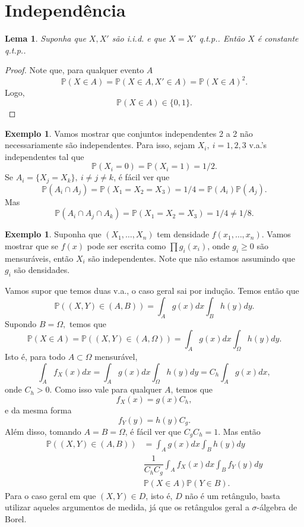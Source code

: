 \documentclass[12pt,a4paper,oneside]{book}
\newtheorem{lemma}[theorem]{Lema}
\theoremstyle{definition}
\newtheorem{example}[theorem]{Exemplo}
\theoremstyle{remark}
\numberwithin{equation}{section}
\newcommand{\pr}{\mathbb{P}}
\begin{document}
\newpage
\section{Independência}

\begin{lemma} Suponha que $X,X'$ são i.i.d. e que $X= X'$ q.t.p.. Então $X$ é constante q.t.p..
\end{lemma}
\begin{proof}
Note que, para qualquer evento $A$
$$\pr(X\in A) = \pr(X\in A, X'\in A) = \pr(X\in A)^2. $$
Logo, 
$$\pr(X\in A)\in \{0,1\}. $$
\end{proof}




\begin{example}
Vamos mostrar que conjuntos independentes 2 a 2 não necessariamente são independentes. Para isso, sejam $X_i, \ i=1,2,3$ v.a.'s independentes  tal que
$$\pr(X_i=0)=\pr(X_i=1) = 1/2. $$
Se $A_{i} =\{X_j=X_k\},\  i\neq j\neq k$, é fácil ver que 
$$\pr(A_{i}\cap A_{j}) = \pr(X_1=X_2=X_3)  = 1/4 = \pr(A_i)\pr(A_j).$$
Mas
$$\pr(A_{i}\cap A_{j}\cap A_k) = \pr(X_1=X_2=X_3)  = 1/4 \neq 1/8. $$
\end{example}

\begin{example}
Suponha que $(X_1,\dots, X_n)$ tem densidade $f(x_1,\dots,x_n).$ Vamos mostrar que se $f(x)$ pode ser escrita como $\prod g_i(x_i)$, onde $g_i\geq 0$ são mensuráveis, então $X_i$ são independentes. Note que não estamos assumindo que $g_i$ são densidades.

Vamos supor que temos duas v.a., o caso geral sai por indução. Temos então que
$$\pr((X,Y)\in (A,B)) = \int_A g(x)dx \int_B h(y)dy. $$
Supondo $B=\Omega,$ temos que
$$\pr(X\in A) = \pr((X,Y)\in (A,\Omega)) = \int_A g(x)dx \int_\Omega h(y)dy. $$
Isto é, para todo $A\subset \Omega$ mensurável,
$$\int_A f_X(x)dx  =\int_A g(x)dx \int_\Omega h(y)dy =  C_h\int_A g(x)dx, $$
onde $C_h>0.$ Como isso vale para qualquer $A$, temos que
$$f_X(x) = g(x)C_h, $$
e da mesma forma
$$f_Y(y) = h(y)C_g. $$
Além disso, tomando $A=B=\Omega$, é fácil ver que $C_gC_h=1.$
Mas então
\begin{align*}
\pr((X,Y)\in (A,B)) &= \int_A g(x)dx \int_B h(y)dy \\
& \dfrac{1}{C_hC_g}\int_A f_X(x)dx \int_B f_Y(y)dy \\
& \pr(X\in A)\pr(Y\in B).
\end{align*}
Para o caso geral em que $(X,Y)\in D$, isto é, $D$ não é um retângulo, basta utilizar aqueles argumentos de medida, já que os retângulos geral a $\sigma$-álgebra de Borel.
\end{example}
\end{document}
